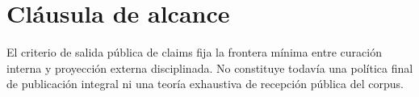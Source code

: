 \section{Cláusula de alcance}
\begin{observation}
El criterio de salida pública de claims fija la frontera mínima entre curación interna y proyección externa disciplinada. No constituye todavía una política final de publicación integral ni una teoría exhaustiva de recepción pública del corpus.
\end{observation}

